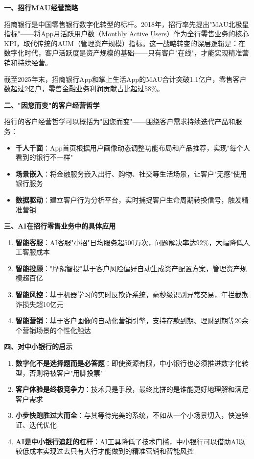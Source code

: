 \begin{casebox}[招商银行智慧零售实践]

\textbf{一、招行MAU经营策略}

招商银行是中国零售银行数字化转型的标杆。2018年，招行率先提出"MAU北极星指标"——将App月活跃用户数（Monthly Active Users）作为全行零售业务的核心KPI，取代传统的AUM（管理资产规模）指标。这一战略转变的深层逻辑是：在数字化时代，客户活跃度是资产规模的基础——只有客户"在线"，才能实现精准营销和持续经营。

截至2025年末，招商银行App和掌上生活App的MAU合计突破1.1亿户，零售客户数超过2亿户，零售金融业务利润贡献占比超过58\%。

\textbf{二、"因您而变"的客户经营哲学}

招行的客户经营哲学可以概括为"因您而变"——围绕客户需求持续迭代产品和服务：

\begin{itemize}[leftmargin=2em]
  \item \textbf{千人千面}：App首页根据用户画像动态调整功能布局和产品推荐，实现"每个人看到的银行不一样"
  \item \textbf{场景嵌入}：将金融服务嵌入出行、购物、社交等生活场景，让客户"无感"使用银行服务
  \item \textbf{数据驱动}：建立客户行为分析平台，实时捕捉客户生命周期转换信号，触发精准营销
\end{itemize}

\textbf{三、AI在招行零售业务中的具体应用}

\begin{enumerate}[leftmargin=2em]
  \item \textbf{智能客服}：AI客服"小招"日均服务超500万次，问题解决率达92\%，大幅降低人工客服成本
  \item \textbf{智能投顾}："摩羯智投"基于客户风险偏好自动生成资产配置方案，管理资产规模超百亿
  \item \textbf{智能风控}：基于机器学习的实时反欺诈系统，毫秒级识别异常交易，年拦截欺诈损失超10亿元
  \item \textbf{智能营销}：基于客户画像的自动化营销引擎，支持存款到期、理财到期等20余个营销场景的个性化触达
\end{enumerate}

\textbf{四、对中小银行的启示}

\begin{enumerate}[leftmargin=2em]
  \item \textbf{数字化不是选择题而是必答题}：即使资源有限，中小银行也必须推进数字化转型，否则将被客户"用脚投票"
  \item \textbf{客户体验是终极竞争力}：技术只是手段，最终比拼的是谁能更好地理解和满足客户需求
  \item \textbf{小步快跑胜过大而全}：与其等待完美的系统，不如从一个小场景切入，快速验证、迭代优化
  \item \textbf{AI是中小银行追赶的杠杆}：AI工具降低了技术门槛，中小银行可以借助AI以较低成本实现过去只有大行才能做到的精准营销和智能风控
\end{enumerate}
\end{casebox}

